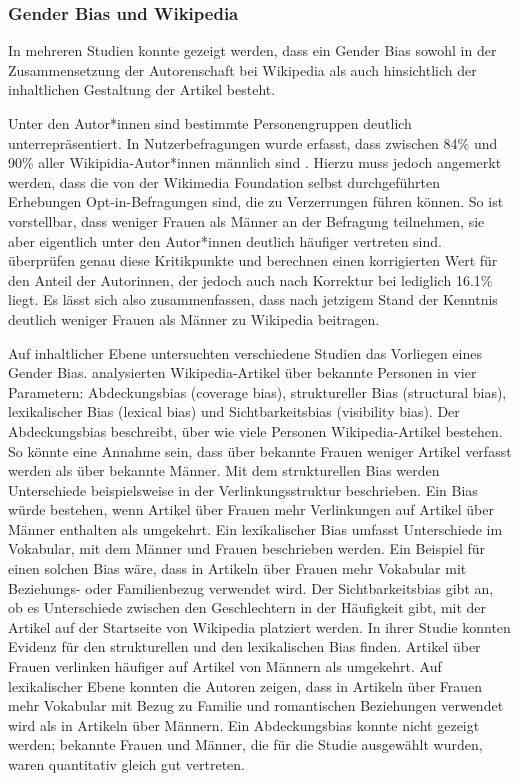 \documentclass[11pt]{article}
\begin{document}
\subsubsection{Gender Bias und Wikipedia}
In mehreren Studien konnte gezeigt werden, dass ein Gender Bias sowohl in der Zusammensetzung der Autorenschaft bei Wikipedia als auch hinsichtlich der inhaltlichen Gestaltung der Artikel besteht. 

Unter den Autor*innen sind bestimmte Personengruppen deutlich unterrepräsentiert. In Nutzerbefragungen wurde erfasst, dass zwischen 84\% und 90\% aller Wikipidia-Autor*innen männlich sind \parencite{wikimediaReport,GraellsGarrido2015}. Hierzu muss jedoch angemerkt werden, dass die von der Wikimedia Foundation selbst durchgeführten Erhebungen Opt-in-Befragungen sind, die zu Verzerrungen führen können. So ist vorstellbar, dass weniger Frauen als Männer an der Befragung teilnehmen, sie aber eigentlich unter den Autor*innen deutlich häufiger vertreten sind. \textcite{Hill2013} überprüfen genau diese Kritikpunkte und berechnen einen korrigierten Wert für den Anteil der Autorinnen, der jedoch auch nach Korrektur bei lediglich 16.1\% liegt. Es lässt sich also zusammenfassen, dass nach jetzigem Stand der Kenntnis deutlich weniger Frauen als Männer zu Wikipedia beitragen.

Auf inhaltlicher Ebene untersuchten verschiedene Studien das Vorliegen eines Gender Bias. \textcite{Wagner2015} analysierten Wikipedia-Artikel über bekannte Personen in vier Parametern: Abdeckungsbias (coverage bias), struktureller Bias (structural bias), lexikalischer Bias (lexical bias) und Sichtbarkeitsbias (visibility bias). Der Abdeckungsbias beschreibt, über wie viele Personen Wikipedia-Artikel bestehen. So könnte eine Annahme sein, dass über bekannte Frauen weniger Artikel verfasst werden als über bekannte Männer. Mit dem strukturellen Bias werden Unterschiede beispielsweise in der Verlinkungsstruktur beschrieben. Ein Bias würde bestehen, wenn Artikel über Frauen mehr Verlinkungen auf Artikel über Männer enthalten als umgekehrt. Ein lexikalischer Bias umfasst Unterschiede im Vokabular, mit dem Männer und Frauen beschrieben werden. Ein Beispiel für einen solchen Bias wäre, dass in Artikeln über Frauen mehr Vokabular mit Beziehungs- oder Familienbezug verwendet wird. Der Sichtbarkeitsbias gibt an, ob es Unterschiede zwischen den Geschlechtern in der Häufigkeit gibt, mit der Artikel auf der Startseite von Wikipedia platziert werden.
In ihrer Studie konnten \textcite{Wagner2015} Evidenz für den strukturellen und den lexikalischen Bias finden. Artikel über Frauen verlinken häufiger auf Artikel von Männern als umgekehrt. Auf lexikalischer Ebene konnten die Autoren zeigen, dass in Artikeln über Frauen mehr Vokabular mit Bezug zu Familie und romantischen Beziehungen verwendet wird als in Artikeln über Männern. Ein Abdeckungsbias konnte nicht gezeigt werden; bekannte Frauen und Männer, die für die Studie ausgewählt wurden, waren quantitativ gleich gut vertreten.
\end{document}
